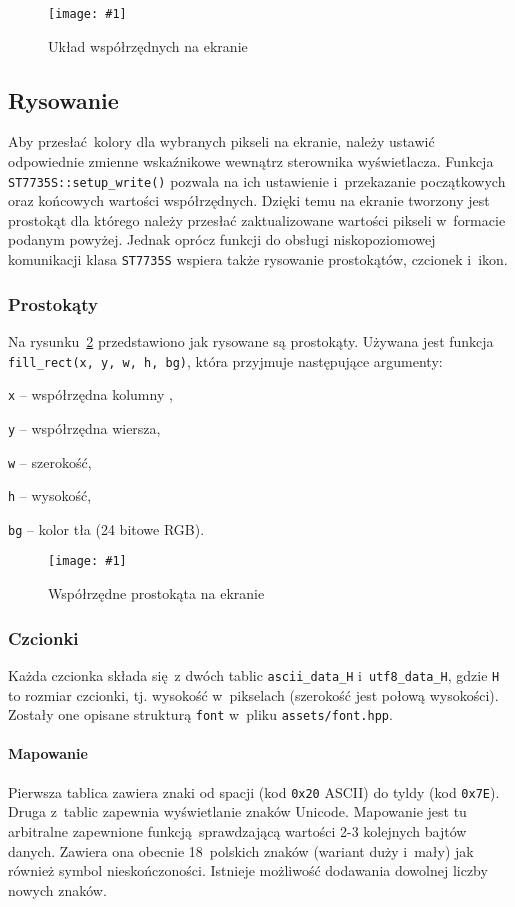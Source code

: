 \documentclass[polish]{aghengthesis}
\let\tempone\itemize
\let\temptwo\enditemize
\renewenvironment{itemize}{\tempone\setlength{\itemsep}{0cm}}{\temptwo}
\newcommand{\imgint}[4]{
	\begin{figure}[{#4}]
		\centering
		\texttt{[image: \#1]}
		\caption{#2}
		\label{#1}
	\end{figure}
}
\newcommand{\imgh}[3]{\imgint{#1}{#2}{#3}{H}}
\begin{document}
		\imgh{3/PicoRadio-screen-xy}{Układ współrzędnych na ekranie}{0.45}
		
		\subsection{Rysowanie}
			Aby przesłać kolory dla wybranych pikseli na ekranie, należy ustawić odpowiednie zmienne wskaźnikowe wewnątrz sterownika wyświetlacza. Funkcja \lstinline|ST7735S::setup_write()| pozwala na ich ustawienie i~przekazanie początkowych oraz końcowych wartości współrzędnych. Dzięki temu na ekranie tworzony jest prostokąt dla którego należy przesłać zaktualizowane wartości pikseli w~formacie podanym powyżej. Jednak oprócz funkcji do obsługi niskopoziomowej komunikacji klasa \lstinline|ST7735S|  wspiera także rysowanie prostokątów, czcionek i~ikon.
			
			\subsubsection{Prostokąty}
				Na rysunku~\ref{3/PicoRadio-screen-rect} przedstawiono jak rysowane są prostokąty. Używana jest funkcja \lstinline|fill_rect(x, y, w, h, bg)|, która przyjmuje następujące argumenty:
				\begin{itemize}
					\item \lstinline|x| -- współrzędna kolumny ,
					\item \lstinline|y| -- współrzędna wiersza,
					\item \lstinline|w| -- szerokość,
					\item \lstinline|h| -- wysokość,
					\item \lstinline|bg| -- kolor tła (24 bitowe RGB).
				\end{itemize}
				
				\imgh{3/PicoRadio-screen-rect}{Współrzędne prostokąta na ekranie}{0.6}
			
			\subsubsection{Czcionki}
				Każda czcionka składa się z dwóch tablic \lstinline|ascii_data_H| i~\lstinline|utf8_data_H|, gdzie \lstinline|H| to rozmiar czcionki, tj. wysokość w~pikselach (szerokość jest połową wysokości). Zostały one opisane strukturą \lstinline|font| w~pliku \lstinline|assets/font.hpp|.
				
				\paragraph{Mapowanie}
					Pierwsza tablica zawiera znaki od spacji (kod \lstinline|0x20| ASCII) do tyldy (kod \lstinline|0x7E|). Druga z~tablic zapewnia wyświetlanie znaków Unicode. Mapowanie jest tu arbitralne zapewnione funkcją sprawdzającą wartości 2-3 kolejnych bajtów danych. Zawiera ona obecnie 18~polskich znaków (wariant duży i~mały) jak również symbol nieskończoności. Istnieje możliwość dodawania dowolnej liczby nowych znaków.
				
\end{document}
